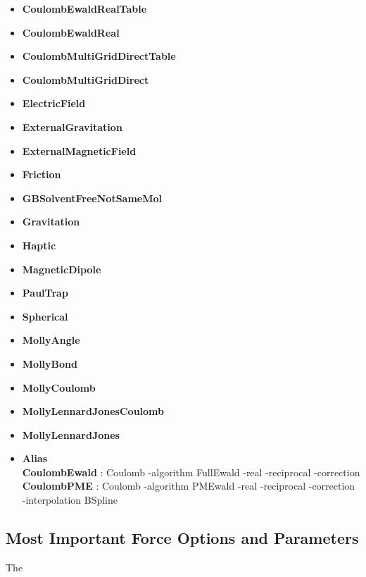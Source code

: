 \documentclass{article}
\begin{document}
\begin{itemize}
\item \textbf{CoulombEwaldRealTable}
\item \textbf{CoulombEwaldReal}
\item \textbf{CoulombMultiGridDirectTable}
\item \textbf{CoulombMultiGridDirect}
\end{itemize}

\begin{itemize}
\item \textbf{ElectricField}
\item \textbf{ExternalGravitation}
\item \textbf{ExternalMagneticField}
\item \textbf{Friction}
\item \textbf{GBSolventFreeNotSameMol}
\item \textbf{Gravitation}
\item \textbf{Haptic}
\item \textbf{MagneticDipole}
\item \textbf{PaulTrap}
\item \textbf{Spherical}
\end{itemize}

\begin{itemize}
\item \textbf{MollyAngle}
\item \textbf{MollyBond}
\item \textbf{MollyCoulomb}
\item \textbf{MollyLennardJonesCoulomb}
\item \textbf{MollyLennardJones}
\end{itemize}

\begin{itemize}
\item \textbf{Alias}\\
\textbf{CoulombEwald} : Coulomb -algorithm FullEwald -real -reciprocal -correction\\
\textbf{CoulombPME} : Coulomb -algorithm PMEwald -real -reciprocal -correction -interpolation BSpline
\end{itemize}

\subsection{Most Important Force Options and Parameters}
The 

\label{forceopts}
\end{document}
